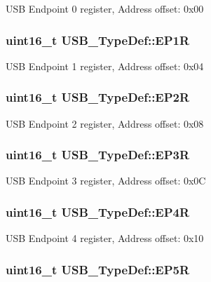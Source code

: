 U\-S\-B Endpoint 0 register, Address offset\-: 0x00 \hypertarget{struct_u_s_b___type_def_a46ff092e0d02d59a9cccb770944953c4}{
\subsubsection[{E\-P1\-R}]{ uint16\-\_\-t U\-S\-B\-\_\-\-Type\-Def\-::\-E\-P1\-R}}\label{struct_u_s_b___type_def_a46ff092e0d02d59a9cccb770944953c4}
U\-S\-B Endpoint 1 register, Address offset\-: 0x04 \hypertarget{struct_u_s_b___type_def_a4cc338562401a6c35c89bd9ab99156c2}{
\subsubsection[{E\-P2\-R}]{ uint16\-\_\-t U\-S\-B\-\_\-\-Type\-Def\-::\-E\-P2\-R}}\label{struct_u_s_b___type_def_a4cc338562401a6c35c89bd9ab99156c2}
U\-S\-B Endpoint 2 register, Address offset\-: 0x08 \hypertarget{struct_u_s_b___type_def_a67c8085fd9ff7b534fb6a09ab6205012}{
\subsubsection[{E\-P3\-R}]{ uint16\-\_\-t U\-S\-B\-\_\-\-Type\-Def\-::\-E\-P3\-R}}\label{struct_u_s_b___type_def_a67c8085fd9ff7b534fb6a09ab6205012}
U\-S\-B Endpoint 3 register, Address offset\-: 0x0\-C \hypertarget{struct_u_s_b___type_def_a865d8a496ae0ff076e2d8794796f48ac}{
\subsubsection[{E\-P4\-R}]{ uint16\-\_\-t U\-S\-B\-\_\-\-Type\-Def\-::\-E\-P4\-R}}\label{struct_u_s_b___type_def_a865d8a496ae0ff076e2d8794796f48ac}
U\-S\-B Endpoint 4 register, Address offset\-: 0x10 \hypertarget{struct_u_s_b___type_def_a7ad4bfc3a492d1cd23aaffc9af72e174}{
\subsubsection[{E\-P5\-R}]{ uint16\-\_\-t U\-S\-B\-\_\-\-Type\-Def\-::\-E\-P5\-R}}\label{struct_u_s_b___type_def_a7ad4bfc3a492d1cd23aaffc9af72e174}
